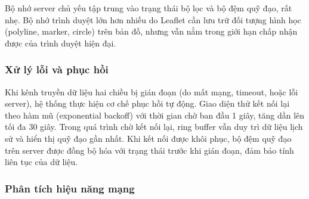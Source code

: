 \begin{table}[H]
\centering
{}
\caption{Phân bổ bộ nhớ cho một phiên tracking}
\label{tab:memory-usage}
\end{table}

Bộ nhớ server chủ yếu tập trung vào trạng thái bộ lọc và bộ đệm quỹ đạo, rất nhẹ. Bộ nhớ trình duyệt lớn hơn nhiều do Leaflet cần lưu trữ đối tượng hình học (polyline, marker, circle) trên bản đồ, nhưng vẫn nằm trong giới hạn chấp nhận được của trình duyệt hiện đại.

\subsubsection{Xử lý lỗi và phục hồi}

\hspace{0.5cm} Khi kênh truyền dữ liệu hai chiều bị gián đoạn (do mất mạng, timeout, hoặc lỗi server), hệ thống thực hiện cơ chế phục hồi tự động. Giao diện thử kết nối lại theo hàm mũ (exponential backoff) với thời gian chờ ban đầu 1 giây, tăng dần lên tối đa 30 giây. Trong quá trình chờ kết nối lại, ring buffer vẫn duy trì dữ liệu lịch sử và hiển thị quỹ đạo gần nhất. Khi kết nối được khôi phục, bộ đệm quỹ đạo trên server được đồng bộ hóa với trạng thái trước khi gián đoạn, đảm bảo tính liên tục của dữ liệu.

\subsubsection{Phân tích hiệu năng mạng}

